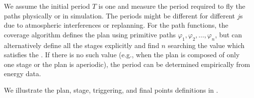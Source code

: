 We assume the initial period $T$ is one and measure the period required to fly the paths physically or in simulation. The periods might be different for different $j$s due to atmospheric interferences or replanning. For the path functions, the coverage algorithm defines the plan using primitive paths $\varphi_1,\varphi_2,\dots,\varphi_n$, but can alternatively define all the stages explicitly and find $n$ searching the value which satisfies the . If there is no such value (e.g., when the plan is composed of only one stage or the plan is aperiodic), the period can be determined empirically from energy data.

We illustrate the plan, stage, triggering, and final points definitions in .

